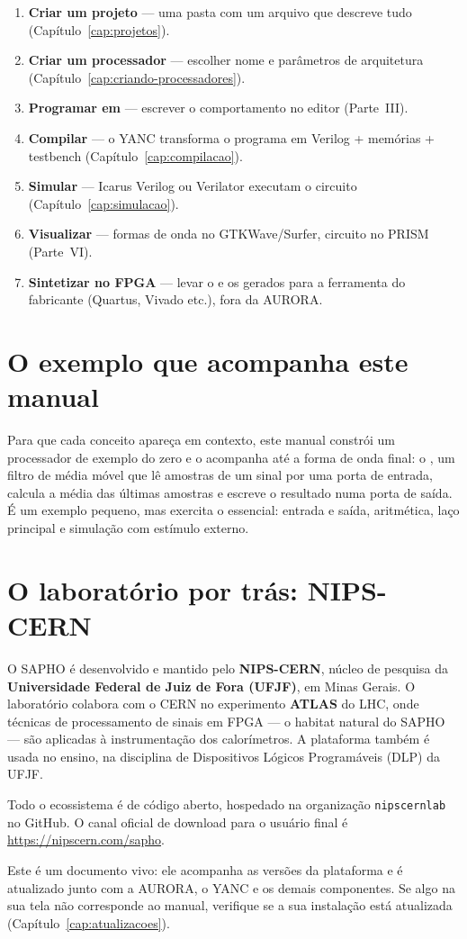 \begin{enumerate}
  \item \textbf{Criar um projeto} --- uma pasta com um arquivo  que descreve tudo (Capítulo~\ref{cap:projetos}).
  \item \textbf{Criar um processador} --- escolher nome e parâmetros de arquitetura (Capítulo~\ref{cap:criando-processadores}).
  \item \textbf{Programar em \cmm{}} --- escrever o comportamento no editor (Parte~III).
  \item \textbf{Compilar} --- o YANC transforma o programa em Verilog + memórias + testbench (Capítulo~\ref{cap:compilacao}).
  \item \textbf{Simular} --- Icarus Verilog ou Verilator executam o circuito (Capítulo~\ref{cap:simulacao}).
  \item \textbf{Visualizar} --- formas de onda no GTKWave/Surfer, circuito no PRISM (Parte~VI).
  \item \textbf{Sintetizar no FPGA} --- levar o  e os  gerados para a ferramenta do fabricante (Quartus, Vivado etc.), fora da AURORA.
\end{enumerate}

\section{O exemplo que acompanha este manual}
\label{sec:exemplo-condutor}

Para que cada conceito apareça em contexto, este manual constrói um processador de exemplo do zero e o acompanha até a forma de onda final: o , um filtro de média móvel que lê amostras de um sinal por uma porta de entrada, calcula a média das últimas amostras e escreve o resultado numa porta de saída. É um exemplo pequeno, mas exercita o essencial: entrada e saída, aritmética, laço principal e simulação com estímulo externo.

\section{O laboratório por trás: NIPS-CERN}

O SAPHO é desenvolvido e mantido pelo \textbf{NIPS-CERN}, núcleo de pesquisa da \textbf{Universidade Federal de Juiz de Fora (UFJF)}, em Minas Gerais. O laboratório colabora com o CERN no experimento \textbf{ATLAS} do LHC, onde técnicas de processamento de sinais em FPGA --- o habitat natural do SAPHO --- são aplicadas à instrumentação dos calorímetros. A plataforma também é usada no ensino, na disciplina de Dispositivos Lógicos Programáveis (DLP) da UFJF.

Todo o ecossistema é de código aberto, hospedado na organização \texttt{nipscernlab} no GitHub. O canal oficial de download para o usuário final é \url{https://nipscern.com/sapho}.

\begin{nota}
Este é um documento vivo: ele acompanha as versões da plataforma e é atualizado junto com a AURORA, o YANC e os demais componentes. Se algo na sua tela não corresponde ao manual, verifique se a sua instalação está atualizada (Capítulo~\ref{cap:atualizacoes}).
\end{nota}
